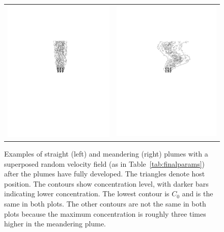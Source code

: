 \documentclass[12pt]{article}
\newcommand{\mycaption}[1]{\caption{#1}}
\begin{document}
		\begin{figure}[htp]
			\centering
			\begin{tabular}{cc}
				\includegraphics[width=3.3in]{figures/Results_meanderstraightpic.pdf} & \includegraphics[width=3.25in]{figures/Results_meanderpic.pdf} \\
			\end{tabular}
			\mycaption{Examples of straight (left) and meandering (right) plumes with a superposed random velocity field (as in Table~\ref{tab:finalparams}) after the plumes have fully developed. The triangles denote host position. The contours show concentration level, with darker bars indicating lower concentration. The lowest contour is $C_0$ and is the same in both plots. The other contours are not the same in both plots because the maximum concentration is roughly three times higher in the meandering plume.}
			\label{fig:Meander}
		\end{figure}
\end{document}
